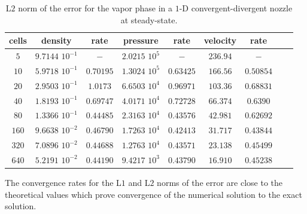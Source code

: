 \documentclass[preprint,10pt]{elsarticle}
\newcommand{\fig}[1]{Fig.~\ref{#1}}                      %
\begin{document}
\begin{table}[H]
\begin{center}
 \caption{\label{tbl:l2_norm_vap} L$2$ norm of the error for the vapor phase in a $1$-D convergent-divergent nozzle at steady-state.}
 \begin{tabular}{|c|c|c|c|c|c|c|c|c|}
 \hline
   cells & density & rate & pressure & rate & velocity & rate \\
 \hline
$5$ &   $9.7144$ $10^{-1}$ & $-$ & $2.0215$ $10^{5}$ & $-$ & $236.94$                   & $-$\\
  \hline
$10$  &  $5.9718$ $10^{-1}$ & $0.70195$ & $1.3024$ $10^{5}$ & $0.63425$ & $166.56$ & $0.50854$\\
   \hline
$20$ & $2.9503$ $10^{-1}$ & $1.0173$ & $6.6503$ $10^{4}$ & $0.96971$ & $103.36$& $0.68831$\\
 \hline
$40$ & $1.8193$ $10^{-1}$ & $0.69747$ & $4.0171$ $10^{4}$ & $0.72728$ & $66.374$& $0.6390$\\
 \hline
$80$ & $1.3366$ $10^{-1}$ & $0.44485$ & $2.3163$ $10^{4}$ & $0.43576$ & $42.981$& $0.62692$\\
 \hline
$160$&$9.6638$ $10^{-2}$ & $0.46790$ & $1.7263$ $10^{4}$ & $0.42413$ & $31.717$& $0.43844$\\
 \hline
$320$&$7.0896$ $10^{-2}$& $0.44688$ & $1.2763$ $10^{4}$ & $0.43571$ & $23.138$& $0.45499$\\
 \hline
 $640$&$5.2191$ $10^{-2}$& $0.44190$ & $9.4217$ $10^{3}$ & $0.43790$ & $16.910$& $0.45238$\\
 \hline
\end{tabular}
\end{center}
\nonumber
\end{table}
The convergence rates for the L$1$ and L$2$ norms of the error are close to the theoretical values which prove convergence of the numerical solution to the exact solution.
\end{document}
